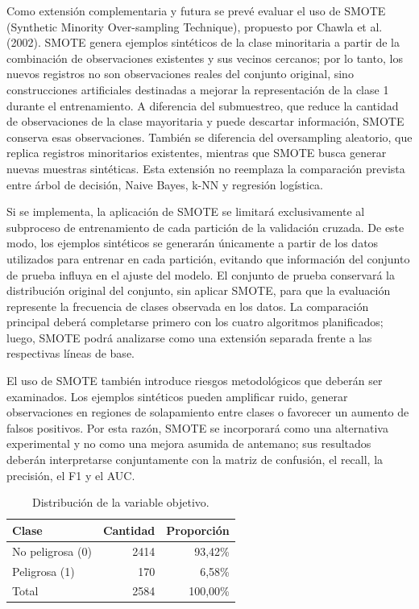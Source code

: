 \documentclass[12pt,a4paper]{article}
\begin{document}
Como extensión complementaria y futura se prevé evaluar el uso de SMOTE (Synthetic Minority Over-sampling Technique), propuesto por Chawla et al. (2002). SMOTE genera ejemplos sintéticos de la clase minoritaria a partir de la combinación de observaciones existentes y sus vecinos cercanos; por lo tanto, los nuevos registros no son observaciones reales del conjunto original, sino construcciones artificiales destinadas a mejorar la representación de la clase 1 durante el entrenamiento. A diferencia del submuestreo, que reduce la cantidad de observaciones de la clase mayoritaria y puede descartar información, SMOTE conserva esas observaciones. También se diferencia del oversampling aleatorio, que replica registros minoritarios existentes, mientras que SMOTE busca generar nuevas muestras sintéticas. Esta extensión no reemplaza la comparación prevista entre árbol de decisión, Naive Bayes, k-NN y regresión logística.

Si se implementa, la aplicación de SMOTE se limitará exclusivamente al subproceso de entrenamiento de cada partición de la validación cruzada. De este modo, los ejemplos sintéticos se generarán únicamente a partir de los datos utilizados para entrenar en cada partición, evitando que información del conjunto de prueba influya en el ajuste del modelo. El conjunto de prueba conservará la distribución original del conjunto, sin aplicar SMOTE, para que la evaluación represente la frecuencia de clases observada en los datos. La comparación principal deberá completarse primero con los cuatro algoritmos planificados; luego, SMOTE podrá analizarse como una extensión separada frente a las respectivas líneas de base.

El uso de SMOTE también introduce riesgos metodológicos que deberán ser examinados. Los ejemplos sintéticos pueden amplificar ruido, generar observaciones en regiones de solapamiento entre clases o favorecer un aumento de falsos positivos. Por esta razón, SMOTE se incorporará como una alternativa experimental y no como una mejora asumida de antemano; sus resultados deberán interpretarse conjuntamente con la matriz de confusión, el recall, la precisión, el F1 y el AUC.

\begin{table}[H]
\centering
\caption{Distribución de la variable objetivo.}
\label{tab:class-distribution}
\begin{tabular}{lrr}
\toprule
\textbf{Clase} & \textbf{Cantidad} & \textbf{Proporción} \\
\midrule
No peligrosa (0) & 2414 & 93,42\% \\
Peligrosa (1) & 170 & 6,58\% \\
\midrule
Total & 2584 & 100,00\% \\
\bottomrule
\end{tabular}
\end{table}
\end{document}
